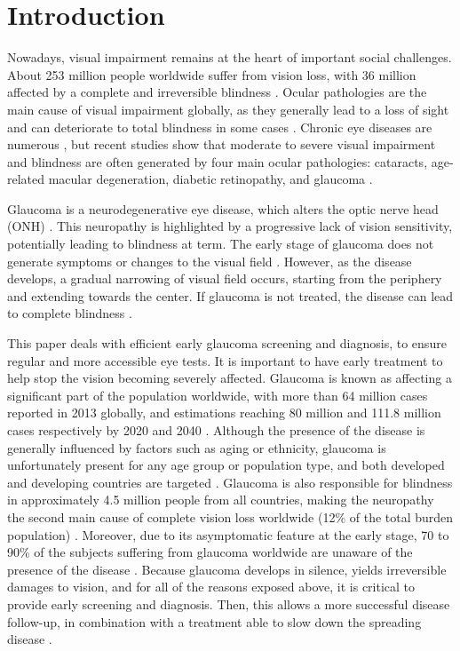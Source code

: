 \section{\label{intro}Introduction}

Nowadays, visual impairment remains at the heart of important social challenges. About 253 million people worldwide suffer from vision loss, with 36 million affected by a complete and irreversible blindness \citep{ref1}. Ocular pathologies are the main cause of visual impairment globally, as they generally lead to a loss of sight and can deteriorate to total blindness in some cases \citep{Foster}.
Chronic eye diseases are numerous \citep{ref4}, but recent studies show that moderate to severe visual impairment and blindness are often generated by four main ocular pathologies: cataracts, age-related macular degeneration, diabetic retinopathy, and glaucoma \citep{ref5,ref2}. 

Glaucoma is a neurodegenerative eye disease, which alters the optic nerve head (ONH) \citep{ref3}. This neuropathy is highlighted by a progressive lack of vision sensitivity, potentially leading to blindness at term. The early stage of glaucoma does not generate symptoms or changes to the visual field \citep{ref15}. However, as the disease develops, a gradual narrowing of visual field occurs, starting from the periphery and extending towards the center. If glaucoma is not treated, the disease can lead to complete blindness \citep{ophthal1}. 

This paper deals with efficient early glaucoma screening and diagnosis, to ensure regular and more accessible eye tests. It is important to have early treatment to help stop the vision becoming severely affected. Glaucoma is known as affecting a significant part of the population worldwide, with more than 64 million cases reported in 2013 globally, and estimations reaching 80 million and 111.8 million cases respectively by 2020 and 2040 \citep{ref3,ref11}.
Although the presence of the disease is generally influenced by factors such as aging or ethnicity, glaucoma is unfortunately present for any age group or population type, and both developed and developing countries are targeted \citep{Kingman}.
Glaucoma is also responsible for blindness in approximately 4.5 million people from all countries, making the neuropathy the second main cause of complete vision loss worldwide (12\% of the total burden population) \citep{ref11}. 
Moreover, due to its asymptomatic feature at the early stage, 70 to 90\% of the subjects suffering from glaucoma worldwide are unaware of the presence of the disease \citep{ref13,ref12}.
Because glaucoma develops in silence, yields irreversible damages to vision, and for all of the reasons exposed above, it is critical to provide early screening and diagnosis.
Then, this allows a more successful disease follow-up, in combination with a treatment able to slow down the spreading disease \citep{ref15,ref14}.

